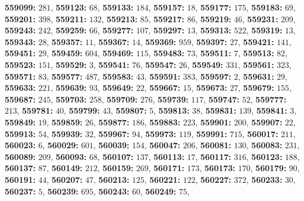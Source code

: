\textsf{\bfseries 559099:} $281$, \textsf{\bfseries 559123:} $68$, \textsf{\bfseries 559133:} $184$, \textsf{\bfseries 559157:} $18$, \textsf{\bfseries 559177:} $175$, \textsf{\bfseries 559183:} $69$, \textsf{\bfseries 559201:} $398$, \textsf{\bfseries 559211:} $132$, \textsf{\bfseries 559213:} $85$, \textsf{\bfseries 559217:} $86$, \textsf{\bfseries 559219:} $46$, \textsf{\bfseries 559231:} $209$, \textsf{\bfseries 559243:} $242$, \textsf{\bfseries 559259:} $66$, \textsf{\bfseries 559277:} $107$, \textsf{\bfseries 559297:} $13$, \textsf{\bfseries 559313:} $522$, \textsf{\bfseries 559319:} $13$, \textsf{\bfseries 559343:} $28$, \textsf{\bfseries 559357:} $11$, \textsf{\bfseries 559367:} $14$, \textsf{\bfseries 559369:} $959$, \textsf{\bfseries 559397:} $27$, \textsf{\bfseries 559421:} $141$, \textsf{\bfseries 559451:} $29$, \textsf{\bfseries 559459:} $604$, \textsf{\bfseries 559469:} $115$, \textsf{\bfseries 559483:} $73$, \textsf{\bfseries 559511:} $7$, \textsf{\bfseries 559513:} $82$, \textsf{\bfseries 559523:} $151$, \textsf{\bfseries 559529:} $3$, \textsf{\bfseries 559541:} $76$, \textsf{\bfseries 559547:} $26$, \textsf{\bfseries 559549:} $331$, \textsf{\bfseries 559561:} $323$, \textsf{\bfseries 559571:} $83$, \textsf{\bfseries 559577:} $487$, \textsf{\bfseries 559583:} $43$, \textsf{\bfseries 559591:} $383$, \textsf{\bfseries 559597:} $2$, \textsf{\bfseries 559631:} $29$, \textsf{\bfseries 559633:} $221$, \textsf{\bfseries 559639:} $93$, \textsf{\bfseries 559649:} $22$, \textsf{\bfseries 559667:} $15$, \textsf{\bfseries 559673:} $27$, \textsf{\bfseries 559679:} $155$, \textsf{\bfseries 559687:} $245$, \textsf{\bfseries 559703:} $258$, \textsf{\bfseries 559709:} $276$, \textsf{\bfseries 559739:} $117$, \textsf{\bfseries 559747:} $52$, \textsf{\bfseries 559777:} $213$, \textsf{\bfseries 559781:} $40$, \textsf{\bfseries 559799:} $43$, \textsf{\bfseries 559807:} $5$, \textsf{\bfseries 559813:} $38$, \textsf{\bfseries 559831:} $139$, \textsf{\bfseries 559841:} $3$, \textsf{\bfseries 559849:} $19$, \textsf{\bfseries 559859:} $26$, \textsf{\bfseries 559877:} $186$, \textsf{\bfseries 559883:} $223$, \textsf{\bfseries 559901:} $200$, \textsf{\bfseries 559907:} $22$, \textsf{\bfseries 559913:} $54$, \textsf{\bfseries 559939:} $32$, \textsf{\bfseries 559967:} $94$, \textsf{\bfseries 559973:} $119$, \textsf{\bfseries 559991:} $715$, \textsf{\bfseries 560017:} $211$, \textsf{\bfseries 560023:} $6$, \textsf{\bfseries 560029:} $601$, \textsf{\bfseries 560039:} $154$, \textsf{\bfseries 560047:} $206$, \textsf{\bfseries 560081:} $130$, \textsf{\bfseries 560083:} $231$, \textsf{\bfseries 560089:} $209$, \textsf{\bfseries 560093:} $68$, \textsf{\bfseries 560107:} $137$, \textsf{\bfseries 560113:} $17$, \textsf{\bfseries 560117:} $316$, \textsf{\bfseries 560123:} $188$, \textsf{\bfseries 560137:} $87$, \textsf{\bfseries 560149:} $212$, \textsf{\bfseries 560159:} $269$, \textsf{\bfseries 560171:} $173$, \textsf{\bfseries 560173:} $170$, \textsf{\bfseries 560179:} $90$, \textsf{\bfseries 560191:} $44$, \textsf{\bfseries 560207:} $47$, \textsf{\bfseries 560213:} $125$, \textsf{\bfseries 560221:} $122$, \textsf{\bfseries 560227:} $372$, \textsf{\bfseries 560233:} $30$, \textsf{\bfseries 560237:} $5$, \textsf{\bfseries 560239:} $695$, \textsf{\bfseries 560243:} $60$, \textsf{\bfseries 560249:} $75$, 
